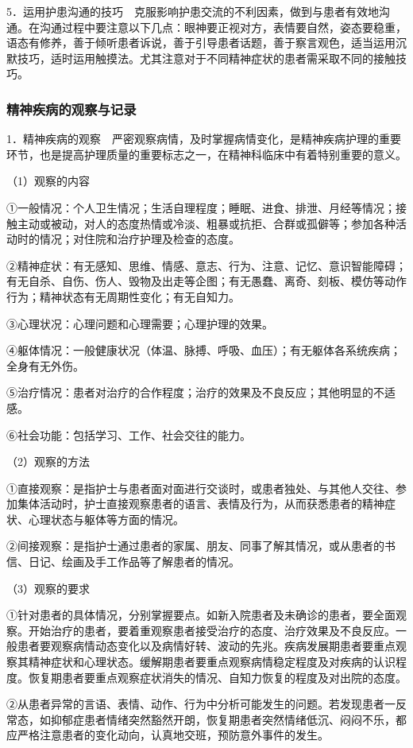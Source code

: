 5．运用护患沟通的技巧　克服影响护患交流的不利因素，做到与患者有效地沟通。在沟通过程中要注意以下几点：眼神要正视对方，表情要自然，姿态要稳重，语态有修养，善于倾听患者诉说，善于引导患者话题，善于察言观色，适当运用沉默技巧，适时运用触摸法。尤其注意对于不同精神症状的患者需采取不同的接触技巧。

\subsubsection{精神疾病的观察与记录}

1．精神疾病的观察　严密观察病情，及时掌握病情变化，是精神疾病护理的重要环节，也是提高护理质量的重要标志之一，在精神科临床中有着特别重要的意义。

（1）观察的内容

①一般情况：个人卫生情况；生活自理程度；睡眠、进食、排泄、月经等情况；接触主动或被动，对人的态度热情或冷淡、粗暴或抗拒、合群或孤僻等；参加各种活动时的情况；对住院和治疗护理及检查的态度。

②精神症状：有无感知、思维、情感、意志、行为、注意、记忆、意识智能障碍；有无自杀、自伤、伤人、毁物及出走等企图；有无愚蠢、离奇、刻板、模仿等动作行为；精神状态有无周期性变化；有无自知力。

③心理状况：心理问题和心理需要；心理护理的效果。

④躯体情况：一般健康状况（体温、脉搏、呼吸、血压）；有无躯体各系统疾病；全身有无外伤。

⑤治疗情况：患者对治疗的合作程度；治疗的效果及不良反应；其他明显的不适感。

⑥社会功能：包括学习、工作、社会交往的能力。

（2）观察的方法

①直接观察：是指护士与患者面对面进行交谈时，或患者独处、与其他人交往、参加集体活动时，护士直接观察患者的语言、表情及行为，从而获悉患者的精神症状、心理状态与躯体等方面的情况。

②间接观察：是指护士通过患者的家属、朋友、同事了解其情况，或从患者的书信、日记、绘画及手工作品等了解患者的情况。

（3）观察的要求

①针对患者的具体情况，分别掌握要点。如新入院患者及未确诊的患者，要全面观察。开始治疗的患者，要着重观察患者接受治疗的态度、治疗效果及不良反应。一般患者要观察病情动态变化以及病情好转、波动的先兆。疾病发展期患者要重点观察其精神症状和心理状态。缓解期患者要重点观察病情稳定程度及对疾病的认识程度。恢复期患者要重点观察症状消失的情况、自知力恢复的程度及对出院的态度。

②从患者异常的言语、表情、动作、行为中分析可能发生的问题。若发现患者一反常态，如抑郁症患者情绪突然豁然开朗，恢复期患者突然情绪低沉、闷闷不乐，都应严格注意患者的变化动向，认真地交班，预防意外事件的发生。


